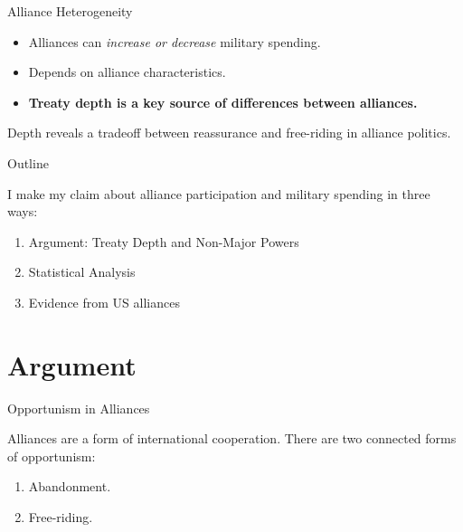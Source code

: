 \documentclass[12pt]{beamer}
\begin{document}

\begin{frame}{Alliance Heterogeneity}


\begin{itemize}
\item Alliances can \textit{increase or decrease} military spending. 
\pause
\item Depends on alliance characteristics. 
\pause 
\item \textbf{Treaty depth is a key source of differences between alliances.}
\end{itemize} 

\end{frame}

 
 \begin{frame}[standout]

Depth reveals a tradeoff between reassurance and free-riding in alliance politics. 

 \end{frame}



\begin{frame}{Outline}

I make my claim about alliance participation and military spending in three ways: 

\pause
\begin{enumerate}
\item Argument: Treaty Depth and Non-Major Powers
\pause
\item Statistical Analysis
\pause
\item Evidence from US alliances
\end{enumerate}


\end{frame}


\section{Argument}



\begin{frame}{Opportunism in Alliances}

Alliances are a form of international cooperation. There are two connected forms of opportunism: 
\begin{enumerate} 
\pause
\item Abandonment.   
\pause
\item Free-riding.
\end{enumerate}  

\end{frame}
\end{document}
